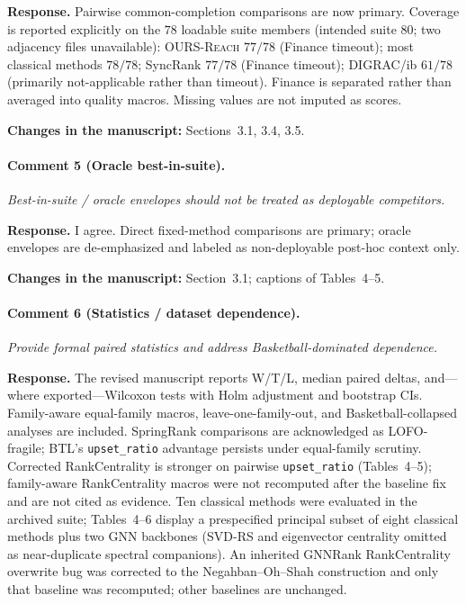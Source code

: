 \documentclass[11pt]{article}
\newcommand{\commentbox}[1]{\par\textit{#1}\par\medskip}
\newcommand{\changes}[1]{\textbf{Changes in the manuscript:} #1\par\medskip}
\begin{document}
\noindent\textbf{Response.}
Pairwise common-completion comparisons are now primary. Coverage is reported explicitly on the $78$ loadable suite members (intended suite $80$; two adjacency files unavailable): \textsc{OURS-Reach} $77/78$ (Finance timeout); most classical methods $78/78$; SyncRank $77/78$ (Finance timeout); DIGRAC/ib $61/78$ (primarily not-applicable rather than timeout). Finance is separated rather than averaged into quality macros. Missing values are not imputed as scores.

\changes{Sections~3.1, 3.4, 3.5.}

\paragraph{Comment 5 (Oracle best-in-suite).}
\commentbox{Best-in-suite / oracle envelopes should not be treated as deployable competitors.}

\noindent\textbf{Response.}
I agree. Direct fixed-method comparisons are primary; oracle envelopes are de-emphasized and labeled as non-deployable post-hoc context only.

\changes{Section~3.1; captions of Tables~4--5.}

\paragraph{Comment 6 (Statistics / dataset dependence).}
\commentbox{Provide formal paired statistics and address Basketball-dominated dependence.}

\noindent\textbf{Response.}
The revised manuscript reports W/T/L, median paired deltas, and---where exported---Wilcoxon tests with Holm adjustment and bootstrap CIs. Family-aware equal-family macros, leave-one-family-out, and Basketball-collapsed analyses are included. SpringRank comparisons are acknowledged as LOFO-fragile; BTL's \texttt{upset\_ratio} advantage persists under equal-family scrutiny. Corrected RankCentrality is stronger on pairwise \texttt{upset\_ratio} (Tables~4--5); family-aware RankCentrality macros were not recomputed after the baseline fix and are not cited as evidence. Ten classical methods were evaluated in the archived suite; Tables~4--6 display a prespecified principal subset of eight classical methods plus two GNN backbones (\textsc{SVD-RS} and eigenvector centrality omitted as near-duplicate spectral companions). An inherited GNNRank RankCentrality overwrite bug was corrected to the Negahban--Oh--Shah construction and only that baseline was recomputed; other baselines are unchanged.
\end{document}
